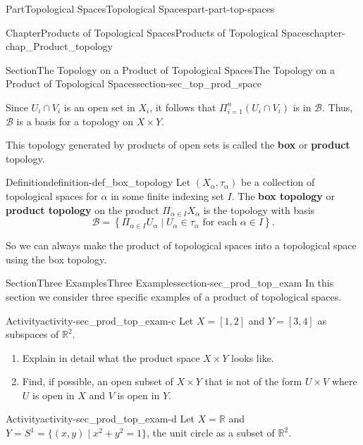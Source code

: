 \documentclass[oneside,10pt,]{book}
\newcommand{\terminology}[1]{\textbf{#1}}
\numberwithin{equation}{chapter}
\newcommand{\R}{\mathbb{R}}
\newcommand{\CB}{\mathcal{B}}
\begin{document}
\begin{partptx}{Part}{Topological Spaces}{}{Topological Spaces}{}{}{part-part-top-spaces}
\begin{chapterptx}{Chapter}{Products of Topological Spaces}{}{Products of Topological Spaces}{}{}{chapter-chap_Product_topology}
\begin{sectionptx}{Section}{The Topology on a Product of Topological Spaces}{}{The Topology on a Product of Topological Spaces}{}{}{section-sec_top_prod_space}
%
\par
Since \(U_i \cap V_i\) is an open set in \(X_i\), it follows that \(\Pi_{i=1}^n (U_i \cap V_i)\) is in \(\CB\). Thus, \(\CB\) is a basis for a topology on \(X \times Y\).%
\par
This topology generated by products of open sets is called the \terminology{box} or \terminology{product} topology.%
\begin{definition}{Definition}{}{definition-def_box_topology}%
%
%
Let \((X_{\alpha}, \tau_{\alpha})\) be a collection of topological spaces for \(\alpha\) in some finite indexing set \(I\). The \terminology{box topology} or \terminology{product topology} on the product \(\Pi_{\alpha \in I} X_{\alpha}\) is the topology with basis%
\begin{equation*}
\CB = \left\{ \Pi_{\alpha \in I} U_{\alpha} \mid U_{\alpha} \in \tau_{\alpha}  \text{ for each }  \alpha \in I \right\}\text{.}
\end{equation*}
%
\end{definition}
So we can always make the product of topological spaces into a topological space using the box topology.%
\end{sectionptx}
%
%
\typeout{************************************************}
\typeout{************************************************}
%
\begin{sectionptx}{Section}{Three Examples}{}{Three Examples}{}{}{section-sec_prod_top_exam}
In this section we consider three specific examples of a product of topological spaces.%
\begin{activity}{Activity}{}{activity-sec_prod_top_exam-c}%
Let \(X = [1,2]\) and \(Y = [3,4]\) as subspaces of \(\R^2\).%
\begin{enumerate}[font=\bfseries,label=(\alph*),ref=\alph*]%
\item{}Explain in detail what the product space \(X \times Y\) looks like.%
\item{}Find, if possible, an open subset of \(X \times Y\) that is not of the form \(U \times V\) where \(U\) is open in \(X\) and \(V\) is open in \(Y\).%
\end{enumerate}%
\end{activity}%
\begin{activity}{Activity}{}{activity-sec_prod_top_exam-d}%
Let \(X = \R\) and \(Y = S^1 = \{(x,y) \mid x^2 + y^2 = 1\}\), the unit circle as a subset of \(\R^2\).%
\begin{enumerate}[font=\bfseries,label=(\alph*),ref=\alph*]%

\end{enumerate}
\end{activity}
\end{sectionptx}
\end{chapterptx}
\end{partptx}
\end{document}
